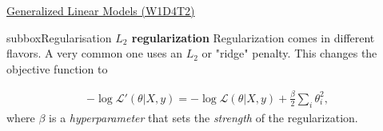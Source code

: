 \begin{textbox}{\href{https://compneuro.neuromatch.io/tutorials/W1D4_GeneralizedLinearModels/student/W1D4_Tutorial2.html}{Generalized Linear Models (W1D4T2)} }
\begin{subbox}{subbox}{Regularisation 
}
\textbf{$L_2$ regularization}
Regularization comes in different flavors. A very common one uses an $L_2$ or "ridge" penalty. This changes the objective function to

\begin{align}
-\log\mathcal{L}'(\theta | X, y)=
-\log\mathcal{L}(\theta | X, y) +\frac\beta2\sum_i\theta_i^2,
\end{align}
where $\beta$ is a \textit{hyperparameter} that sets the \textit{strength} of the regularization.

\end{subbox}
\end{textbox}